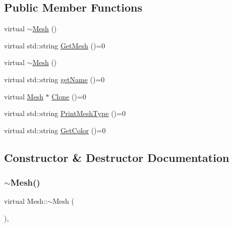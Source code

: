 \subsection*{Public Member Functions}
\begin{DoxyCompactItemize}
\item 
virtual \mbox{\hyperlink{class_mesh_ad6a041191ed55c693254e945ce2869ff}{$\sim$\+Mesh}} ()
\item 
virtual std\+::string \mbox{\hyperlink{class_mesh_ac9a0bc76a4e34c3985cbc4c20692c7df}{Get\+Mesh}} ()=0
\item 
virtual \mbox{\hyperlink{class_mesh_ad6a041191ed55c693254e945ce2869ff}{$\sim$\+Mesh}} ()
\item 
virtual std\+::string \mbox{\hyperlink{class_mesh_aa131fe1c2586fe60988155db77c57272}{get\+Name}} ()=0
\item 
virtual \mbox{\hyperlink{class_mesh}{Mesh}} $\ast$ \mbox{\hyperlink{class_mesh_a11928acab4066671d10e9e531ad96fb6}{Clone}} ()=0
\item 
virtual std\+::string \mbox{\hyperlink{class_mesh_a0d34fc4317a5e3bc2437b610141b9109}{Print\+Mesh\+Type}} ()=0
\item 
virtual std\+::string \mbox{\hyperlink{class_mesh_aa413c0ccbc081aa50a2946e1c6930b0c}{Get\+Color}} ()=0
\end{DoxyCompactItemize}


\subsection{Constructor \& Destructor Documentation}
\mbox{\label{class_mesh_ad6a041191ed55c693254e945ce2869ff}} 
\subsubsection{\texorpdfstring{$\sim$Mesh()}{~Mesh()}\hspace{0.1cm}{\footnotesize\ttfamily [1/2]}}
{\footnotesize\ttfamily virtual Mesh\+::$\sim$\+Mesh (\begin{DoxyParamCaption}{ }\end{DoxyParamCaption})\hspace{0.3cm}{\ttfamily [inline]}, {\ttfamily [virtual]}}

\mbox{\label{class_mesh_ad6a041191ed55c693254e945ce2869ff}} 
